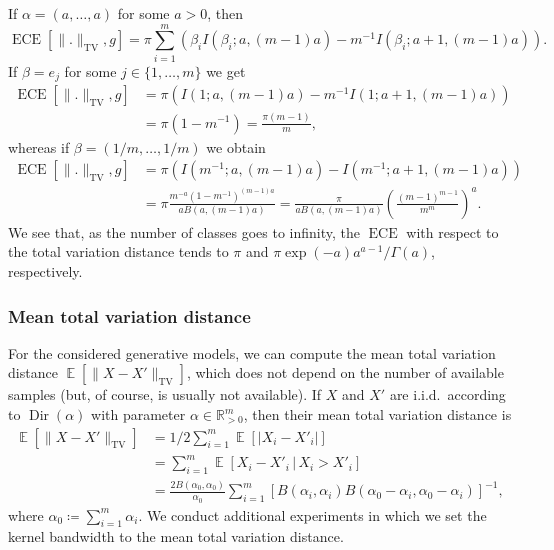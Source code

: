 \documentclass{article}
\DeclareMathOperator{\Expect}{\mathbb{E}}
\DeclareMathOperator{\Dir}{Dir}
\DeclareMathOperator{\ECE}{ECE}
\newcommand{\given}{\,|\,}
\begin{document}
If $\alpha = (a, \ldots, a)$ for some $a > 0$, then
\begin{equation*}
  \ECE[\|.\|_{\mathrm{TV}},g] = \pi \sum_{i=1}^m \left(\beta_i I(\beta_i; a, (m-1)a) - m^{-1} I(\beta_i; a + 1, (m-1)a)\right).
\end{equation*}
If $\beta = e_j$ for some $j \in \{1,\ldots,m\}$ we get
\begin{equation*}
  \begin{split}
  \ECE[\|.\|_{\mathrm{TV}},g] &= \pi \left(I(1; a, (m-1)a) - m^{-1} I(1; a + 1, (m-1)a)\right) \\
  &= \pi(1 - m^{-1}) = \frac{\pi(m-1)}{m},
  \end{split}
\end{equation*}
whereas if $\beta = (1/m, \ldots, 1/m)$ we obtain
\begin{equation*}
  \begin{split}
  \ECE[\|.\|_{\mathrm{TV}},g] &= \pi \left(I(m^{-1}; a, (m-1)a) - I(m^{-1}; a + 1, (m-1)a)\right) \\
  &= \pi \frac{m^{-a}{(1-m^{-1})}^{(m-1)a}}{a B(a, (m-1)a)} = \frac{\pi}{a B(a, (m-1)a)} {\left(\frac{{(m-1)}^{m-1}}{m^m}\right)}^a.
  \end{split}
\end{equation*}
We see that, as the number of classes goes to infinity, the $\ECE$ with respect
to the total variation distance tends to $\pi$ and
$\pi \exp{(-a)} a^{a-1} / \Gamma(a)$, respectively.

\subsubsection{Mean total variation distance}

For the considered generative models, we can compute the mean total variation
distance $\Expect[\|X - X'\|_{\mathrm{TV}}]$, which does not depend on the number of
available samples (but, of course, is usually not available). If $X$ and $X'$
are i.i.d.\ according to $\Dir(\alpha)$ with parameter
$\alpha \in \mathbb{R}^m_{>0}$, then their mean total variation distance is
\begin{equation*}
  \begin{split}
    \Expect[\|X - X'\|_{\mathrm{TV}}] &= 1/2 \sum_{i=1}^m \Expect[|X_i - X'_i|] \\
    &= \sum_{i=1}^m \Expect[X_i - X'_i \given X_i > X'_i] \\
    &= \frac{2 B(\alpha_0, \alpha_0)}{\alpha_0} \sum_{i=1}^m {[B(\alpha_i, \alpha_i) B(\alpha_0 - \alpha_i, \alpha_0 - \alpha_i)]}^{-1},
  \end{split}
\end{equation*}
where $\alpha_0 \coloneqq \sum_{i=1}^m \alpha_i$. We conduct additional
experiments in which we set the kernel bandwidth to the mean total variation
distance.
\end{document}
